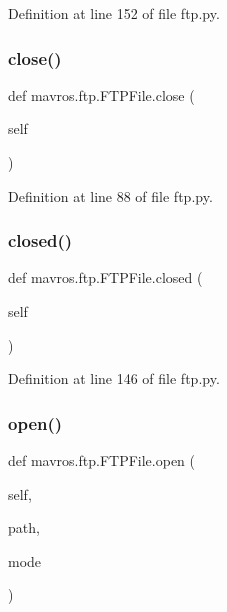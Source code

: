 Definition at line 152 of file ftp.\+py.

\mbox{\label{classmavros_1_1ftp_1_1FTPFile_a0ee10b7bd1ada00958549feb8ee64892}} 
\subsubsection{\texorpdfstring{close()}{close()}}
{\footnotesize\ttfamily def mavros.\+ftp.\+F\+T\+P\+File.\+close (\begin{DoxyParamCaption}\item[{}]{self }\end{DoxyParamCaption})}



Definition at line 88 of file ftp.\+py.

\mbox{\label{classmavros_1_1ftp_1_1FTPFile_a8d93c57761c8b69342d3939718a5418e}} 
\subsubsection{\texorpdfstring{closed()}{closed()}}
{\footnotesize\ttfamily def mavros.\+ftp.\+F\+T\+P\+File.\+closed (\begin{DoxyParamCaption}\item[{}]{self }\end{DoxyParamCaption})}



Definition at line 146 of file ftp.\+py.

\mbox{\label{classmavros_1_1ftp_1_1FTPFile_a3d38aa5af0f898e95939ac30e507a26b}} 
\subsubsection{\texorpdfstring{open()}{open()}}
{\footnotesize\ttfamily def mavros.\+ftp.\+F\+T\+P\+File.\+open (\begin{DoxyParamCaption}\item[{}]{self,  }\item[{}]{path,  }\item[{}]{mode }\end{DoxyParamCaption})}

